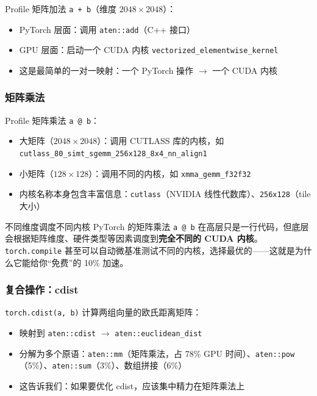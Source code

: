 Profile 矩阵加法 \texttt{a + b}（维度 $2048 \times 2048$）：
\begin{itemize}
    \item PyTorch 层面：调用 \texttt{aten::add}（C++ 接口）
    \item GPU 层面：启动一个 CUDA 内核 \texttt{vectorized\_elementwise\_kernel}
    \item 这是最简单的一对一映射：一个 PyTorch 操作 $\rightarrow$ 一个 CUDA 内核
\end{itemize}

\subsubsection{矩阵乘法}

Profile 矩阵乘法 \texttt{a @ b}：
\begin{itemize}
    \item 大矩阵（$2048 \times 2048$）：调用 CUTLASS 库的内核，如 \texttt{cutlass\_80\_simt\_sgemm\_256x128\_8x4\_nn\_align1}
    \item 小矩阵（$128 \times 128$）：调用不同的内核，如 \texttt{xmma\_gemm\_f32f32}
    \item 内核名称本身包含丰富信息：\texttt{cutlass}（NVIDIA 线性代数库）、\texttt{256x128}（tile 大小）
\end{itemize}

\begin{knowledgebox}{不同维度调度不同内核}
PyTorch 的矩阵乘法 \texttt{a @ b} 在高层只是一行代码，但底层会根据矩阵维度、硬件类型等因素调度到\textbf{完全不同的 CUDA 内核}。\texttt{torch.compile} 甚至可以自动微基准测试不同的内核，选择最优的——这就是为什么它能给你``免费''的 10\% 加速。
\end{knowledgebox}

\subsubsection{复合操作：cdist}

\texttt{torch.cdist(a, b)} 计算两组向量的欧氏距离矩阵：
\begin{itemize}
    \item 映射到 \texttt{aten::cdist} $\rightarrow$ \texttt{aten::euclidean\_dist}
    \item 分解为多个原语：\texttt{aten::mm}（矩阵乘法，占 78\% GPU 时间）、\texttt{aten::pow}（5\%）、\texttt{aten::sum}（3\%）、数组拼接（6\%）
    \item 这告诉我们：如果要优化 cdist，应该集中精力在矩阵乘法上
\end{itemize}

